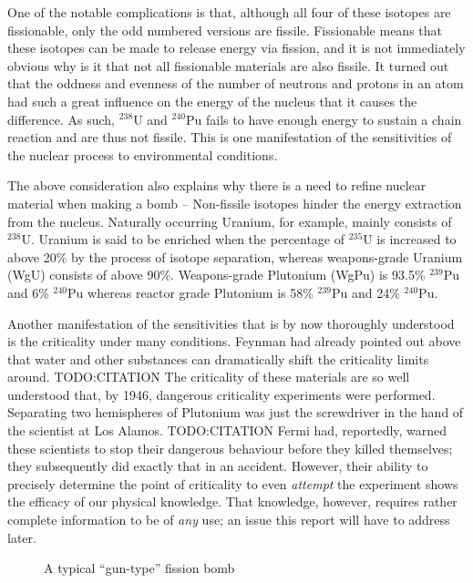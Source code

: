 \documentclass[twoside,titlepage,11pt,twocolumn,a4paper]{article}
\begin{document}
One of the notable complications is that, although all four of these
isotopes are fissionable, only the odd numbered versions are
fissile. Fissionable means that these isotopes can be made to release
energy via fission, and it is not immediately obvious why is it that
not all fissionable materials are also fissile. It turned out that the
oddness and evenness of the number of neutrons and protons in an atom
had such a great influence on the energy of the nucleus that it causes
the difference. As such, \( \mathrm{^{238}U} \) and \(
\mathrm{^{240}Pu} \) fails to have enough energy to sustain a chain
reaction and are thus not fissile. This is one manifestation of the
sensitivities of the nuclear process to environmental conditions.

The above consideration also explains why there is a need to refine
nuclear material when making a bomb -- Non-fissile isotopes hinder the
energy extraction from the nucleus. Naturally occurring Uranium, for
example, mainly consists of \( \mathrm{^{238}U} \).  Uranium is said
to be enriched when the percentage of \( \mathrm{^{235}U} \) is
increased to above 20\% by the process of isotope separation, whereas
weapons-grade Uranium (WgU) consists of above
90\%. \citep{blackmarket} Weapons-grade Plutonium (WgPu) is 93.5\% \(
\mathrm{^{239}Pu} \) and 6\% \( \mathrm{^{240}Pu} \) whereas reactor
grade Plutonium is 58\% \( \mathrm{^{239}Pu} \) and 24\% \(
\mathrm{^{240}Pu} \). \citep{drell1993}

Another manifestation of the sensitivities that is by now thoroughly
understood is the criticality under many conditions. Feynman had
already pointed out above that water and other substances can
dramatically shift the criticality limits around. TODO:CITATION The
criticality of these materials are so well understood that, by 1946,
dangerous criticality experiments were performed. Separating two
hemispheres of Plutonium was just the screwdriver in the hand of the
scientist at Los Alamos. TODO:CITATION Fermi had, reportedly, warned
these scientists to stop their dangerous behaviour before they killed
themselves; they subsequently did exactly that in an
accident. However, their ability to precisely determine the point of
criticality to even \emph{attempt} the experiment shows the efficacy
of our physical knowledge. That knowledge, however, requires rather
complete information to be of \emph{any} use; an issue this report
will have to address later.

\begin{figure}
  \caption{A typical ``gun-type'' fission bomb}
\end{figure}
\end{document}
